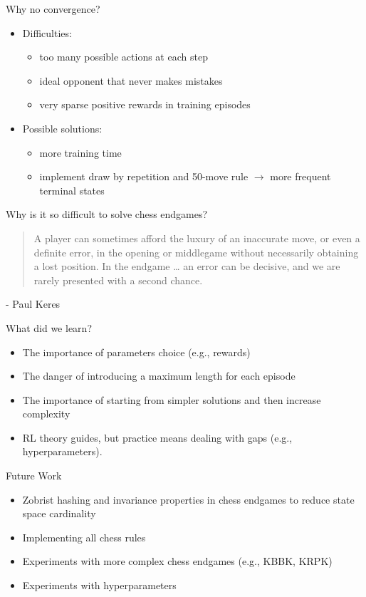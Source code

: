 \begin{frame}{Why no convergence?}
  \begin{itemize}
    \item Difficulties:
    \begin{itemize}
      \item too many possible actions at each step
      \item ideal opponent that never makes mistakes
      \item very sparse positive rewards in training episodes
    \end{itemize}
    \item Possible solutions:
    \begin{itemize}
      \item more training time 
      \item implement draw by repetition and 50-move rule $\rightarrow$ more frequent terminal states
    \end{itemize}
  \end{itemize}
\end{frame}

\begin{frame}
  Why is it so difficult to solve chess endgames?
\vfill
\begin{quote}
A player can sometimes afford the luxury of an inaccurate move, or even a definite error, in the opening or middlegame without necessarily obtaining a lost position. In the endgame … an error can be decisive, and we are rarely presented with a second chance.
\end{quote}

\hfill - Paul Keres
\vfill
\end{frame}

\begin{frame}{What did we learn?}
  \begin{itemize}
    \item The importance of parameters choice (e.g., rewards)
    \item The danger of introducing a maximum length for each episode
    \item The importance of starting from simpler solutions and then increase complexity
    \item RL theory guides, but practice means dealing with gaps (e.g., hyperparameters).
  \end{itemize}
\end{frame}

\begin{frame}{Future Work}
  \begin{itemize}
    \item Zobrist hashing and invariance properties in chess endgames to reduce state space cardinality
    \item Implementing all chess rules
    \item Experiments with more complex chess endgames (e.g., KBBK, KRPK)
    \item Experiments with hyperparameters 
  \end{itemize}
\end{frame}

